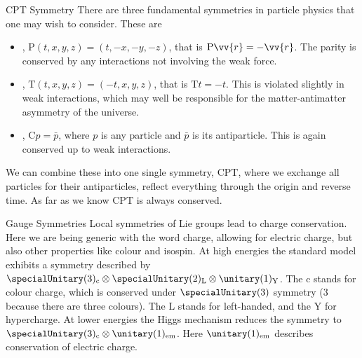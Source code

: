 \documentclass[fleqn]{NotesClass}
\newcommand*{\directproduct}{\otimes}
\newcommand*{\Csym}{\mathrm{C}}
\newcommand*{\Psym}{\mathrm{P}}
\newcommand*{\Tsym}{\mathrm{T}}
\begin{document}
    \begin{exm}{CPT Symmetry}{}
        There are three fundamental symmetries in particle physics that one may wish to consider.
        These are
        \begin{itemize}
            \item {}, \(\Psym(t, x, y, z) = (t, -x, -y, -z)\), that is \(\Psym \vv{r} = -\vv{r}\).
            The parity is conserved by any interactions not involving the weak force.
            \item {}, \(\Tsym(t, x, y, z) = (-t, x, y, z)\), that is \(\Tsym t = -t\).
            This is violated slightly in weak interactions, which may well be responsible for the matter-antimatter asymmetry of the universe.
            \item {}, \(\Csym p = \bar{p}\), where \(p\) is any particle and \(\bar{p}\) is its antiparticle.
            This is again conserved up to weak interactions.
        \end{itemize}
        We can combine these into one single symmetry, \({\Csym}{\Psym}{\Tsym}\), where we exchange all particles for their antiparticles, reflect everything through the origin and reverse time. 
        As far as we know \({\Csym}{\Psym}{\Tsym}\) is always conserved.
    \end{exm}
    
    \begin{exm}{Gauge Symmetries}{}
        Local symmetries of Lie groups lead to charge conservation.
        Here we are being generic with the word charge, allowing for electric charge, but also other properties like colour and isospin.
        At high energies the standard model exhibits a symmetry described by \(\specialUnitary(3)_{\mathrm{c}} \directproduct \specialUnitary(2)_{\mathrm{L}} \directproduct \unitary(1)_{\mathrm{Y}}\).
        The \(\mathrm{c}\) stands for colour charge, which is conserved under \(\specialUnitary(3)\) symmetry (3 because there are three colours).
        The \(\mathrm{L}\) stands for left-handed, and the \(\mathrm{Y}\) for hypercharge.
        At lower energies the Higgs mechanism reduces the symmetry to \(\specialUnitary(3)_{\mathrm{c}} \directproduct \unitary(1)_{\mathrm{em}}\).
        Here \(\unitary(1)_{\mathrm{em}}\) describes conservation of electric charge.
    \end{exm}
\end{document}
